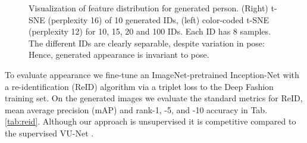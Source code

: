 \begin{figure}[htp]
\begin{subfigure}{0.49\linewidth}
		\end{subfigure}
%
		\caption{Visualization of feature distribution for generated person. (Right) t-SNE (perplexity 16) of 10 generated IDs, (left) color-coded t-SNE (perplexity 12) for 10, 15, 20 and 100 IDs. Each ID has 8 samples. The different IDs are clearly separable, despite variation in pose: Hence, generated appearance is invariant to pose.}
		\label{fig:pckcurve}
	\end{figure}


	To evaluate appearance we fine-tune an ImageNet-pretrained \cite{russakovsky15imagenet} Inception-Net \cite{szegedy15inception} with a re-identification (ReID) algorithm \cite{xiao17reidjoint} via a triplet loss \cite{hermans17reidtriplet} to the Deep Fashion training set.
	On the generated images we evaluate the standard metrics for ReID, mean average precision (mAP) and rank-1, -5, and -10 accuracy in Tab. \ref{tab:reid}.
	Although our approach is unsupervised it is competitive compared to the supervised VU-Net \cite{esser18}.


